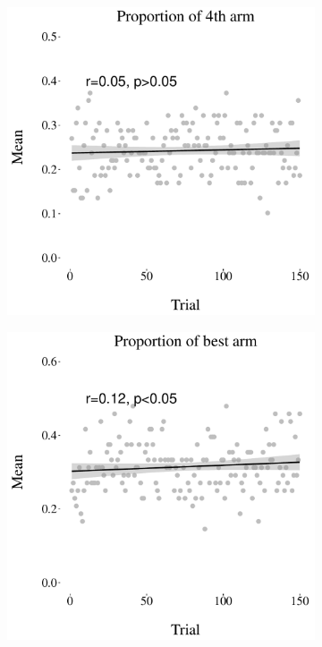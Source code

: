 \documentclass[a4paper,natbib]{apa6}
\begin{document}
\begin{figure}[ht]
\begin{subfigure}{.33\textwidth}
  \includegraphics[width=.95\textwidth]{figure31.pdf}
\caption{}
  \end{subfigure}
\begin{subfigure}{.33\textwidth}
  \centering
\includegraphics[width=.95\textwidth]{figure32.pdf}

\end{subfigure}
\end{figure}
\end{document}
